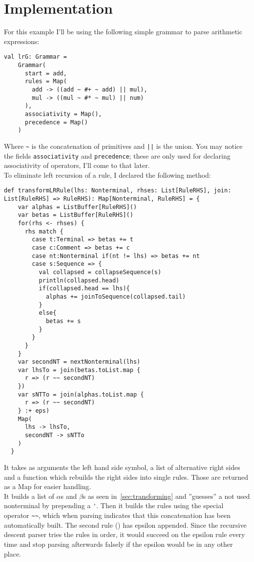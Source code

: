 \documentclass{article}
\begin{document}
\section{Implementation}
For this example I'll be using the following simple grammar to parse arithmetic expressions:
\begin{lstlisting}
val lrG: Grammar = 
    Grammar(
      start = add,
      rules = Map(
        add -> ((add ~ #+ ~ add) || mul),
        mul -> ((mul ~ #* ~ mul) || num)
      ),
      associativity = Map(),
      precedence = Map()
    )
\end{lstlisting}
Where \verb|~| is the concatenation of primitives and \verb$||$ is the union. You may notice the fields \verb|associativity| and \verb|precedence|; these are only used for declaring associativity of operators, I'll come to that later.\\
To eliminate left recursion of a rule, I declared the following method:
\begin{lstlisting}
def transformLRRule(lhs: Nonterminal, rhses: List[RuleRHS], join: List[RuleRHS] => RuleRHS): Map[Nonterminal, RuleRHS] = {
    var alphas = ListBuffer[RuleRHS]()
    var betas = ListBuffer[RuleRHS]()
    for(rhs <- rhses) {
      rhs match {
        case t:Terminal => betas += t
        case c:Comment => betas += c
        case nt:Nonterminal if(nt != lhs) => betas += nt
        case s:Sequence => {
          val collapsed = collapseSequence(s)
          println(collapsed.head)
          if(collapsed.head == lhs){
            alphas += joinToSequence(collapsed.tail)
          }
          else{
            betas += s 
          }
        } 
      }
    }
    var secondNT = nextNonterminal(lhs)
    var lhsTo = join(betas.toList.map {
      r => (r ~~ secondNT)
    })
    var sNTTo = join(alphas.toList.map {
      r => (r ~~ secondNT)
    } :+ eps)
    Map(
      lhs -> lhsTo,
      secondNT -> sNTTo  
    )
  }
\end{lstlisting}
It takes as arguments the left hand side symbol, a list of alternative right sides and a function which rebuilds the right sides into single rules. Those are returned as a Map for easier handling. \\
It builds a list of $\alpha$s and $\beta$s as seen in~\ref{sec:transforming} and ''guesses'' a not used nonterminal by prepending a \verb|'|. Then it builds the rules using the special operator \verb|~~|, which when parsing indicates that this concatenation has been automatically built. The second rule () has epsilon appended. Since the recursive descent parser tries the rules in order, it would succeed on the epsilon rule every time and stop parsing afterwards falsely if the epsilon would be in any other place.\\
\end{document}
